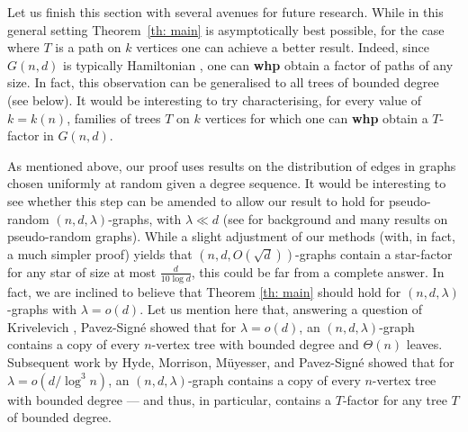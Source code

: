 \documentclass[notitlepage]{scrartcl}
\newtheorem{theorem}{Theorem}
\newcommand{\IH}[1]{{\color{blue}{\large #1}}}
\begin{document}

Let us finish this section with several avenues for future research. While in this general setting Theorem~\ref{th: main} is asymptotically best possible, for the case where $T$ is a path on $k$ vertices one can achieve a better result. Indeed, since $G(n,d)$ is typically Hamiltonian \cite{robinson1994almost}, one can \textbf{whp} obtain a factor of paths of any size. In fact, this observation can be generalised to all trees of bounded degree (see below). It would be interesting to try characterising, for every value of $k=k(n)$, families of trees $T$ on $k$ vertices for which one can \textbf{whp} obtain a $T$-factor in $G(n,d)$. 

As mentioned above, our proof uses results \cite{McKaySurvey, gao2023subgraph} on the distribution of edges in graphs chosen uniformly at random given a degree sequence. It would be interesting to see whether this step can be amended to allow our result to hold for pseudo-random $(n,d,\lambda)$-graphs, with $\lambda\ll d$ (see \cite{KS06} for background and many results on pseudo-random graphs). While a slight adjustment of our methods (with, in fact, a much simpler proof) yields that $\left(n,d,O(\sqrt{d})\right)$-graphs contain a star-factor for any star of size at most $\frac{d}{10\log d}$, this could be far from a complete answer. In fact, we are inclined to believe that Theorem \ref{th: main} should hold for $(n,d,\lambda)$-graphs with $\lambda=o(d)$. Let us mention here that, answering a question of Krivelevich \cite{K23}, Pavez-Sign\'e \cite{p23} showed that for $\lambda=o(d)$, an $(n,d,\lambda)$-graph contains a copy of every $n$-vertex tree with bounded degree and $\Theta(n)$ leaves. Subsequent work by Hyde, Morrison, M\"uyesser, and Pavez-Sign\'e \cite{HMMPM23} showed that for $\lambda=o(d/\log^3n)$, an $(n,d,\lambda)$-graph contains a copy of every $n$-vertex tree with bounded degree --- and thus, in particular, contains a $T$-factor for any tree $T$ of bounded degree. 
\end{document}
